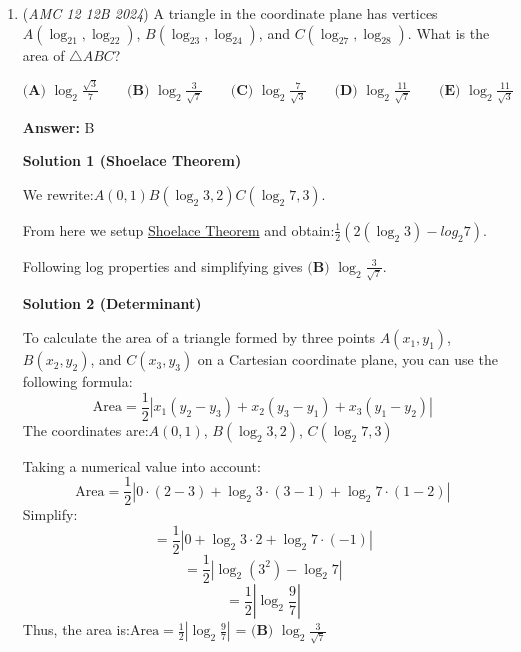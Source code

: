 \begin{enumerate}
 
            \begin{itemize}
        \item Please do not use this unless you have a lot of time and enough brain power to calculate a lot of Totient.
            \end{itemize}
            


	\item (\textit{AMC 12 12B 2024}) A triangle in the coordinate plane has vertices $A(\log_21,\log_22)$, $B(\log_23,\log_24)$, and $C(\log_27,\log_28)$. What is the area of $\triangle ABC$?


 $\textbf{(A) }\log_2\frac{\sqrt3}7\qquad \textbf{(B) }\log_2\frac3{\sqrt7}\qquad \textbf{(C) }\log_2\frac7{\sqrt3}\qquad \textbf{(D) }\log_2\frac{11}{\sqrt7}\qquad \textbf{(E) }\log_2\frac{11}{\sqrt3}\qquad$

 \textbf{Answer: }B



\textbf{Solution 1 (Shoelace Theorem)}

We rewrite:$A(0,1)$$B(\log _{2} 3, 2)$$C(\log _{2} 7, 3)$.

 From here we setup \href{https://artofproblemsolving.com/wiki/index.php?title=Shoelace\_Theorem}{Shoelace Theorem} and obtain:$\frac{1}{2}(2(\log _{2} 3) - log _{2} 7)$.

 Following log properties and simplifying gives $\boxed{\textbf{(B) }\log_2 \frac{3}{\sqrt{7}}}$.

 



\textbf{Solution 2 (Determinant)}

To calculate the area of a triangle formed by three points \( A(x_1, y_1) \), \( B(x_2, y_2) \), and \( C(x_3, y_3) \) on a Cartesian coordinate plane, you can use the following formula:
 \[\text{Area} = \frac{1}{2} \left| x_1(y_2 - y_3) + x_2(y_3 - y_1) + x_3(y_1 - y_2) \right|\]The coordinates are:$A(0, 1)$, $B(\log_2 3, 2)$, $C(\log_2 7, 3)$

 Taking a numerical value into account:
 \[\text{Area} = \frac{1}{2} \left| 0 \cdot (2 - 3) + \log_2 3 \cdot (3 - 1) + \log_2 7 \cdot (1 - 2) \right|\]Simplify:
 \[= \frac{1}{2} \left| 0 + \log_2 3 \cdot 2 + \log_2 7 \cdot (-1) \right|\]
 \[= \frac{1}{2} \left| \log_2 (3^2) - \log_2 7 \right|\]
 \[= \frac{1}{2} \left| \log_2 \frac{9}{7} \right|\]Thus, the area is:$\text{Area} = \frac{1}{2} \left| \log_2 \frac{9}{7} \right|$ = $\boxed{\textbf{(B) }\log_2 \frac{3}{\sqrt{7}}}$





\end{enumerate}
